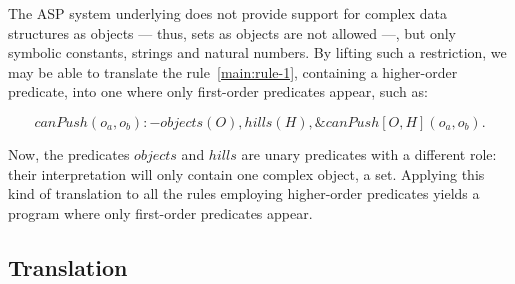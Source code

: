 The ASP system underlying \ah does not provide support for complex data structures as objects --- thus, sets as objects are not allowed ---, but only symbolic constants, strings and natural numbers.
By lifting such a restriction, we may be able to translate the rule~\eqref{main:rule-1}, containing a higher-order predicate, into one where only first-order predicates appear, such as:

$$ canPush(o_a,o_b) :- objects(O), hills(H), \&canPush[O,H](o_a,o_b). \label{main:rule-2} $$







Now, the predicates $objects$ and $hills$ are unary predicates with a different role: their interpretation will only contain one complex object, a set.
Applying this kind of translation to all the rules employing higher-order predicates yields a program where only first-order predicates appear.



\subsection{Translation}

